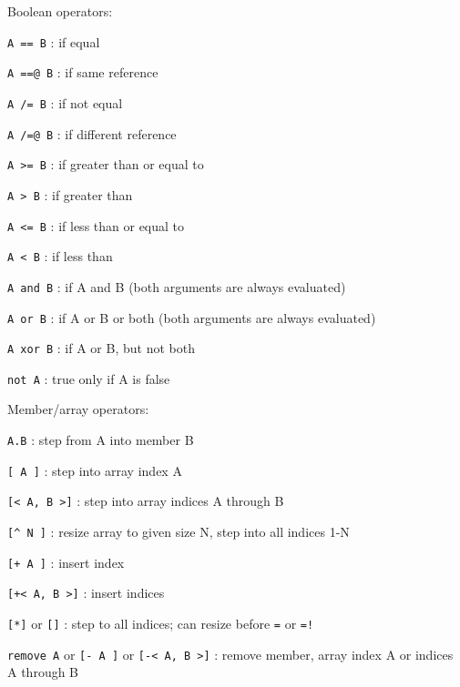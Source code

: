 \documentclass{article}
\begin{document}
\noindent
Boolean operators:
\begin{description}
\item{\verb#A == B#} :  if equal
\item{\verb#A ==@ B#} :  if same reference
\item{\verb#A /= B#} :  if not equal
\item{\verb#A /=@ B#} :  if different reference
\item{\verb#A >= B#} :  if greater than or equal to
\item{\verb#A > B#} :  if greater than
\item{\verb#A <= B#} :  if less than or equal to
\item{\verb#A < B#} :  if less than
\item{\verb#A and B#} :  if A and B (both arguments are always evaluated)
\item{\verb#A or B#} :  if A or B or both (both arguments are always evaluated)
\item{\verb#A xor B#} :  if A or B, but not both
\item{\verb#not A#} :  true only if A is false\\
\end{description}

\noindent
Member/array operators:
\begin{description}
\item{\verb#A.B#} :  step from A into member B
\item{\verb#[ A ]#} :  step into array index A
\item{\verb#[< A, B >]#} :  step into array indices A through B
\item{\verb#[^ N ]#} :  resize array to given size N, step into all indices 1-N
\item{\verb#[+ A ]#} :  insert index
\item{\verb#[+< A, B >]#} :  insert indices
\item{\verb#[*]#  or  \verb#[]#} :  step to all indices; can resize before \verb#=# or \verb#=!#
\item{\verb#remove A#  or  \verb#[- A ]#  or  \verb#[-< A, B >]#} :  remove member, array index A or indices A through B\\
\end{description}
\end{document}
